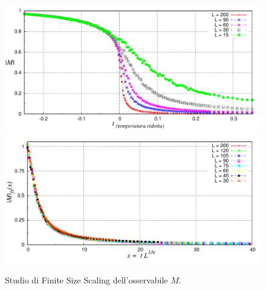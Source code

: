 \begin{figure}[htbp]
      \centering
      \caption[ParteD\_Ossvst.cpp $\;\rightarrow\;$ Mvst\_file.p ]{Studio di Finite Size Scaling dell'osservabile $M$.}\label{fig: M_finitesize_1}
	\includegraphics[width=1\textwidth]{Immagini/ParteD/Mvst}
	\bigskip
	\includegraphics[width=1\textwidth]{Immagini/ParteD/Mvst_finite}
\end{figure}

